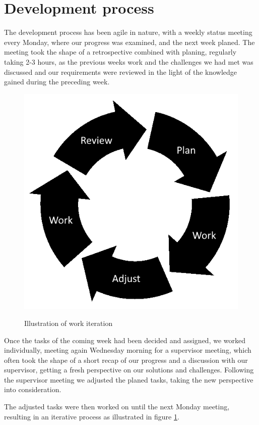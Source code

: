 \section{Development process}


The development process has been agile in nature, with a weekly status meeting every Monday, where our progress was examined, and the next week planed. The meeting took the shape of a retrospective combined with planing, regularly taking 2-3 hours, as the previous weeks work and the challenges we had met was discussed and our requirements were reviewed in the light of the knowledge gained during the preceding week.

\begin{figure}[h]
\centering
\includegraphics[scale=0.5]{02-Body/Images/WorkIterations.png}
\label{fig:iterate}
\caption{Illustration of work iteration}
\end{figure}

Once the tasks of the coming week had been decided and assigned, we worked individually, meeting again Wednesday morning for a supervisor meeting, which often took the shape of a short recap of our progress and a discussion with our supervisor, getting a fresh perspective on our solutions and challenges. Following the supervisor meeting we adjusted the planed tasks, taking the new perspective into consideration.

The adjusted tasks were then worked on until the next Monday meeting, resulting in an iterative process as illustrated in figure \ref{fig:iterate}.

